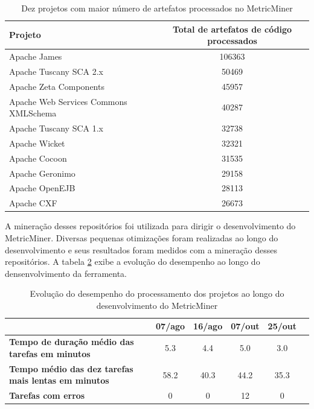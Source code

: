 \documentclass[a4paper, 12pt, twoside]{book}
\begin{document}
        \begin{table}\begin{center}
        \begin{tabular}{| p{6cm} | c |}
            \hline                        
            \textbf{Projeto} & \textbf{Total de artefatos de código processados} \\
            \hline
            Apache James & 106363 \\
            \hline
            Apache Tuscany SCA 2.x & 50469 \\
            \hline
            Apache Zeta Components & 45957\\
            \hline
            Apache Web Services Commons XMLSchema & 40287 \\
            \hline
            Apache Tuscany SCA 1.x & 32738 \\
            \hline
            Apache Wicket & 32321 \\
            \hline
            Apache Cocoon & 31535 \\
            \hline
            Apache Geronimo & 29158 \\
            \hline
            Apache OpenEJB & 28113 \\
            \hline
            Apache CXF & 26673 \\
            \hline
        \end{tabular}
        \caption{Dez projetos com maior número de artefatos processados no MetricMiner \label{tab:artefatos}}
        \end{center}\end{table}

        A mineração desses repositórios foi utilizada para dirigir o desenvolvimento do MetricMiner. Diversas pequenas otimizações foram realizadas ao longo do desenvolvimento e seus resultados foram medidos com a mineração desses repositórios. A tabela \ref{tab:evolucao} exibe a evolução do desempenho ao longo do densenvolvimento da ferramenta.


        \begin{table}\begin{center}
        \begin{tabular}{| p{5cm} | c | c | c | c | c | }
            \hline                        
             & \textbf{07/ago} & \textbf{16/ago} & \textbf{07/out} & \textbf{25/out} \\
            \hline
            \textbf{Tempo de duração médio das tarefas em minutos} & 5.3 & 4.4 & 5.0 & 3.0 \\
            \hline
            \textbf{Tempo médio das dez tarefas mais lentas em minutos} & 58.2 & 40.3 & 44.2 & 35.3 \\
            \hline
            \textbf{Tarefas com erros} & 0 & 0 & 12 & 0 \\
            \hline
        \end{tabular}
        \caption{Evolução do desempenho do processamento dos projetos ao longo do desenvolvimento do MetricMiner \label{tab:evolucao}}
        \end{center}\end{table}
\end{document}

